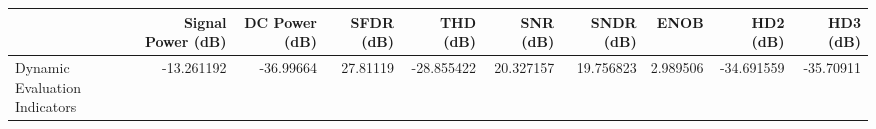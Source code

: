 \begin{tabular}{lrrrrrrrrr}
\toprule
{} &  Signal Power (dB) &  DC Power (dB) &  SFDR (dB) &   THD (dB) &   SNR (dB) &  SNDR (dB) &      ENOB &   HD2 (dB) &  HD3 (dB) \\
\midrule
Dynamic Evaluation Indicators &         -13.261192 &      -36.99664 &   27.81119 & -28.855422 &  20.327157 &  19.756823 &  2.989506 & -34.691559 & -35.70911 \\
\bottomrule
\end{tabular}
